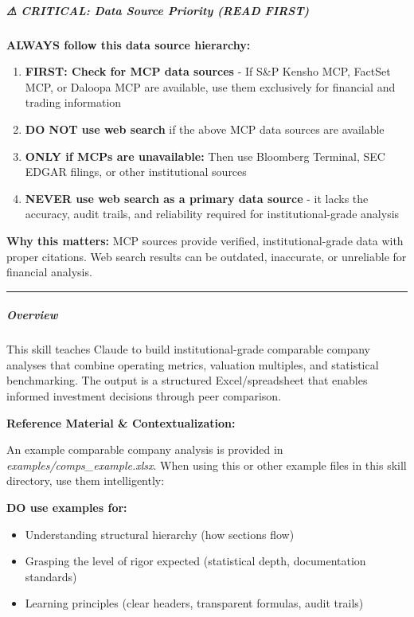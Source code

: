 \documentclass[11pt]{article}
\begin{document}
\subparagraph{⚠ CRITICAL: Data Source Priority (READ FIRST)}\mbox{}\par

\textbf{ALWAYS follow this data source hierarchy:}


\begin{enumerate}[leftmargin=*,itemsep=2pt,topsep=2pt]
\item {} \textbf{FIRST: Check for MCP data sources} - If S\&P Kensho MCP, FactSet MCP, or Daloopa MCP are available, use them exclusively for financial and trading information
\item {} \textbf{DO NOT use web search} if the above MCP data sources are available
\item {} \textbf{ONLY if MCPs are unavailable:} Then use Bloomberg Terminal, SEC EDGAR filings, or other institutional sources
\item {} \textbf{NEVER use web search as a primary data source} - it lacks the accuracy, audit trails, and reliability required for institutional-grade analysis
\end{enumerate}

\textbf{Why this matters:} MCP sources provide verified, institutional-grade data with proper citations. Web search results can be outdated, inaccurate, or unreliable for financial analysis.


\vspace{0.5em}\hrule\vspace{0.5em}

\subparagraph{Overview}\mbox{}\par
This skill teaches Claude to build institutional-grade comparable company analyses that combine operating metrics, valuation multiples, and statistical benchmarking. The output is a structured Excel/spreadsheet that enables informed investment decisions through peer comparison.


\textbf{Reference Material \& Contextualization:}


An example comparable company analysis is provided in \emph{examples/comps\_\allowbreak{}example.xlsx}. When using this or other example files in this skill directory, use them intelligently:


\textbf{DO use examples for:}

\begin{itemize}[leftmargin=*,itemsep=2pt,topsep=2pt]
\item {} Understanding structural hierarchy (how sections flow)
\item {} Grasping the level of rigor expected (statistical depth, documentation standards)
\item {} Learning principles (clear headers, transparent formulas, audit trails)
\end{itemize}
\end{document}
